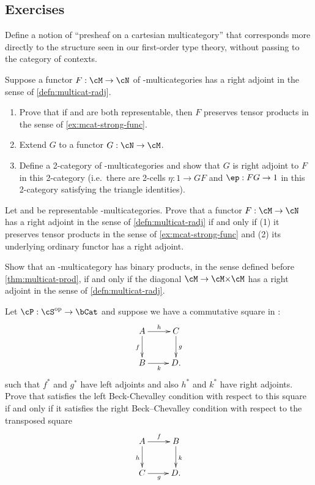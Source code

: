 \subsection*{Exercises}

\begin{ex}\label{ex:pshf-multicat}
  Define a notion of ``presheaf on a cartesian multicategory'' that corresponds more directly to the structure seen in our first-order type theory, without passing to the category of contexts.
\end{ex}

\begin{ex}\label{ex:multicat-radj}
  Suppose a functor $F:\cM\to\cN$ of \fS-multicategories has a right adjoint in the sense of \cref{defn:multicat-radj}.
  \begin{enumerate}
  \item Prove that if \cM and \cN are both representable, then $F$ preserves tensor products in the sense of \cref{ex:mcat-strong-func}.
  \item Extend $G$ to a functor $G:\cN\to\cM$.
  \item Define a 2-category of \fS-multicategories and show that $G$ is right adjoint to $F$ in this 2-category (i.e.\ there are 2-cells $\eta : 1 \to G F$ and $\ep : F G \to 1$ in this 2-category satisfying the triangle identities).
  \end{enumerate}
\end{ex}

\begin{ex}\label{ex:moncat-radj}
  Let \cM and \cN be representable \fS-multicategories.
  Prove that a functor $F:\cM\to\cN$ has a right adjoint in the sense of \cref{defn:multicat-radj} if and only if (1) it preserves tensor products in the sense of \cref{ex:mcat-strong-func} and (2) its underlying ordinary functor has a right adjoint.
\end{ex}

\begin{ex}\label{ex:multicat-prod-ladj}
  Show that an \fS-multicategory \cM has binary products, in the sense defined before \cref{thm:multicat-prod}, if and only if the diagonal $\cM\to \cM\times \cM$ has a right adjoint in the sense of \cref{defn:multicat-radj}.
\end{ex}

\begin{ex}\label{ex:beck-chev}
  Let $\cP:\cS\op\to\bCat$ and suppose we have a commutative square in \cS:
  \[ \xymatrix{ A \ar[r]^h \ar[d]_f & C \ar[d]^g \\ B \ar[r]_k & D. } \]
  such that $f^*$ and $g^*$ have left adjoints and also $h^*$ and $k^*$ have right adjoints.
  Prove that \cP satisfies the left Beck-Chevalley condition with respect to this square if and only if it satisfies the right Beck--Chevalley condition with respect to the transposed square
  \[ \xymatrix{ A \ar[r]^f \ar[d]_h & B \ar[d]^k \\ C \ar[r]_g & D. } \]
\end{ex}

